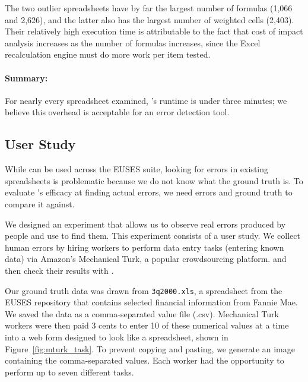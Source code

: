 The two outlier spreadsheets have by far the largest number of formulas
(1,066 and 2,626), and the latter also has the largest number of
weighted cells (2,403). Their relatively high execution time is
attributable to the fact that cost of impact analysis increases as the
number of formulas increases, since the Excel recalculation engine
must do more work per item tested.

\paragraph{Summary:} For nearly every spreadsheet
 examined, \checkcell{}'s runtime is under three minutes; we believe
 this overhead is acceptable for an error detection tool.





\subsection{User Study}
\label{sec:user_study}

While \checkcell{} can be used across the EUSES suite, looking for
errors in existing spreadsheets is problematic because we do not know
what the ground truth is. To evaluate \checkcell{}'s efficacy at
finding actual errors, we need errors and ground truth to compare it
against.

We designed an experiment that allows us to observe real errors
produced by people and use \checkcell{} to find them. This experiment
consists of a user study. We collect human errors by hiring workers to
perform data entry tasks (entering known data) via Amazon's Mechanical
Turk, a popular crowdsourcing platform. and then check their results
with \checkcell{}.

Our ground truth data was drawn from \texttt{3q2000.xls}, a
spreadsheet from the EUSES repository that contains selected financial
information from Fannie Mae. We saved the data as a comma-separated
value file (.csv). Mechanical Turk workers were then paid 3 cents to
enter 10 of these numerical values at a time into a web form designed to look
like a spreadsheet, shown in Figure~\ref{fig:mturk_task}. To prevent
copying and pasting, we generate an image containing the
comma-separated values.  Each worker had the opportunity to perform up
to seven different tasks.

